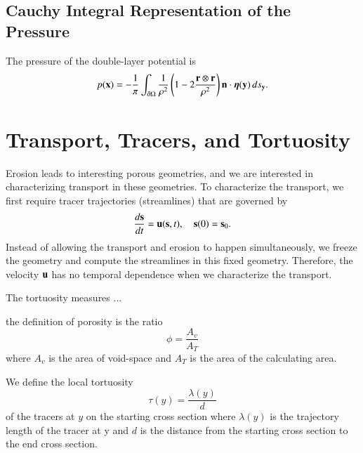 \documentclass[preprint, 10pt]{elsarticle}
\begin{document}
\subsection{Cauchy Integral Representation of the Pressure}
The pressure of the double-layer potential is
\begin{align}
  p({\mathbf{x}}) = -\frac{1}{\pi} \int_{{\partial}\Omega} \frac{1}{\rho^2}
    \left(1 - 2 \frac{{\mathbf{r}} \otimes {\mathbf{r}}}{\rho^2} \right) {\mathbf{n}}
    \cdot {\boldsymbol\eta}({\mathbf{y}}) \, ds_{\mathbf{y}}.
\end{align}




\section{Transport, Tracers, and Tortuosity}
Erosion leads to interesting porous geometries, and we are interested in
characterizing transport in these geometries.  To characterize the
transport, we first require tracer trajectories (streamlines) that are
governed by
\begin{align}
  \frac{d{\mathbf{s}}}{dt} = {\mathbf{u}}({\mathbf{s}},t), \quad {\mathbf{s}}(0) = {\mathbf{s}}_0.
\end{align}
Instead of allowing the transport and erosion to happen simultaneously,
we freeze the geometry and compute the streamlines in this fixed
geometry.  Therefore, the velocity ${\mathbf{u}}$ has no temporal dependence when
we characterize the transport.

The tortuosity measures ...

{\color{red} the definition of porosity is the ratio 
$$\phi=\frac{A_v}{A_T}$$
where $A_v$ is the area of void-space and $A_T$ is the area of the calculating area.

We define the local tortuosity
$$\tau(y)=\frac{\lambda(y)}{d}$$ 
of the tracers at $y$ on the starting cross section
where $\lambda(y)$ is the trajectory length of the tracer at y 
and $d$ is the distance from the starting cross section to 
the end cross section. }  

\end{document}
